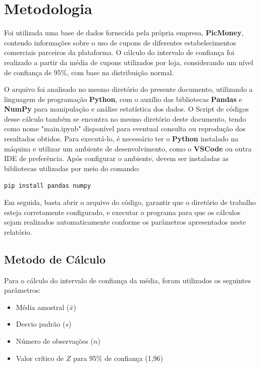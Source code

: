 \documentclass[12pt]{article}
\begin{document}
\section*{Metodologia}

Foi utilizada uma base de dados fornecida pela própria empresa, \textbf{PicMoney}, contendo informações sobre o uso de cupons de diferentes estabelecimentos comerciais parceiros da plataforma.
O cálculo do intervalo de confiança foi realizado a partir da média de cupons utilizados por loja, considerando um nível de confiança de 95\%, com base na distribuição normal.

O arquivo foi analisado no mesmo diretório do presente documento, utilizando a linguagem de programação \textbf{Python}, com o auxílio das bibliotecas \textbf{Pandas} e \textbf{NumPy} para manipulação e análise estatística dos dados. O Script de códigos desse cálculo também se encontra no mesmo diretório deste documento, tendo como nome "main.ipynb" disponível para eventual consulta ou reprodução dos resultados obtidos.  
Para executá-lo, é necessário ter o \textbf{Python} instalado na máquina e utilizar um ambiente de desenvolvimento, como o \textbf{VSCode} ou outra IDE de preferência.  
Após configurar o ambiente, devem ser instaladas as bibliotecas utilizadas por meio do comando:

\begin{center}
\texttt{pip install pandas numpy}
\end{center}

Em seguida, basta abrir o arquivo do código, garantir que o diretório de trabalho esteja corretamente configurado, e executar o programa para que os cálculos sejam realizados automaticamente conforme os parâmetros apresentados neste relatório.

\subsection*{Metodo de Cálculo}
Para o cálculo do intervalo de confiança da média, foram utilizados os seguintes parâmetros:

\begin{itemize}
    \item Média amostral ($\bar{x}$)
    \item Desvio padrão ($s$)
    \item Número de observações ($n$)
    \item Valor crítico de $Z$ para 95\% de confiança (1,96)
\end{itemize}
\end{document}
